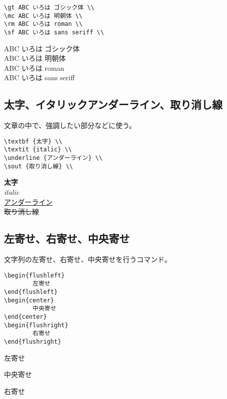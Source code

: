 \documentclass{jsarticle}
\begin{document}
\begin{verbatim}
\gt ABC いろは ゴシック体 \\
\mc ABC いろは 明朝体 \\
\rm ABC いろは roman \\
\sf ABC いろは sans seriff \\
\end{verbatim}

{
\noindent
\gt ABC いろは ゴシック体 \\
\mc ABC いろは 明朝体 \\
\rm ABC いろは roman \\
\sf ABC いろは sans seriff \\
}

\subsection{太字、イタリックアンダーライン、取り消し線}
文章の中で、強調したい部分などに使う。

\begin{verbatim}
\textbf {太字} \\
\textit {italic} \\
\underline {アンダーライン} \\
\sout {取り消し線} \\
\end{verbatim}

{
\noindent
\textbf {太字} \\
\textit {italic} \\
\underline {アンダーライン} \\
\sout {取り消し線} \\
}

\subsection{左寄せ、右寄せ、中央寄せ}
文字列の左寄せ、右寄せ、中央寄せを行うコマンド。

\begin{verbatim}
\begin{flushleft}
		左寄せ
\end{flushleft}
\begin{center}
		中央寄せ
\end{center}
\begin{flushright}
		右寄せ
\end{flushright}
\end{verbatim}

{
\begin{flushleft}
		左寄せ
\end{flushleft}
\begin{center}
		中央寄せ
\end{center}
\begin{flushright}
		右寄せ
\end{flushright}
}
\end{document}
